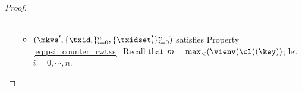 \begin{proof}
\begin{itemize}
\begin{itemize}
\[\begin{array}{ll}
\end{array}
\]
%

\item $(\mkvs',  \{\txid_{i}\}_{i=0}^{n}, \{\txidset'_{i}\}_{i=0}^{n})$ satisfies Property \eqref{eq:psi_counter_rwtxs}. 
Recall that $m = \max_{<}(\vienv(\cl)(\key))$; let $i=0,\cdots,n$.


\end{itemize}
\end{itemize}
\end{proof}
